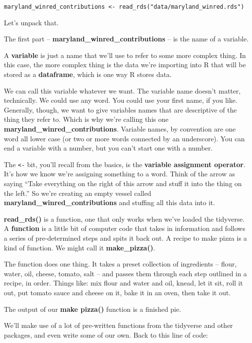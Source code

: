 \documentclass[
  letterpaper,
  DIV=11,
  numbers=noendperiod]{scrreprt}
\begin{document}
\texttt{maryland\_winred\_contributions\ \textless{}-\ read\_rds("data/maryland\_winred.rds")}

Let's unpack that.

The first part -- \textbf{maryland\_winred\_contributions} -- is the
name of a variable.

A \textbf{variable} is just a name that we'll use to refer to some more
complex thing. In this case, the more complex thing is the data we're
importing into R that will be stored as a \textbf{dataframe}, which is
one way R stores data.

We can call this variable whatever we want. The variable name doesn't
matter, technically. We could use any word. You could use your first
name, if you like. Generally, though, we want to give variables names
that are descriptive of the thing they refer to. Which is why we're
calling this one \textbf{maryland\_winred\_contributions}. Variable
names, by convention are one word all lower case (or two or more words
connected by an underscore). You can end a variable with a number, but
you can't start one with a number.

The \texttt{\textless{}-} bit, you'll recall from the basics, is the
\textbf{variable assignment operator}. It's how we know we're assigning
something to a word. Think of the arrow as saying ``Take everything on
the right of this arrow and stuff it into the thing on the left.'' So
we're creating an empty vessel called
\textbf{maryland\_winred\_contributions} and stuffing all this data into
it.

\textbf{read\_rds()} is a function, one that only works when we've
loaded the tidyverse. A \textbf{function} is a little bit of computer
code that takes in information and follows a series of pre-determined
steps and spits it back out. A recipe to make pizza is a kind of
function. We might call it \textbf{make\_pizza()}.

The function does one thing. It takes a preset collection of ingredients
-- flour, water, oil, cheese, tomato, salt -- and passes them through
each step outlined in a recipe, in order. Things like: mix flour and
water and oil, knead, let it sit, roll it out, put tomato sauce and
cheese on it, bake it in an oven, then take it out.

The output of our \textbf{make pizza()} function is a finished pie.

We'll make use of a lot of pre-written functions from the tidyverse and
other packages, and even write some of our own. Back to this line of
code:
\end{document}

